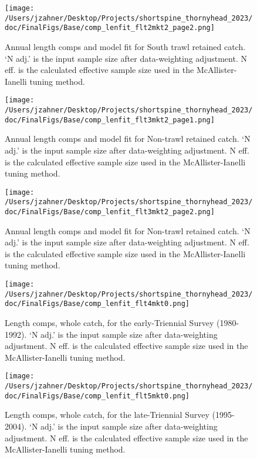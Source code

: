 \documentclass[11pt,
  english,
  letterpaper,
]{article}
\begin{document}
\begin{figure}
\centering
\texttt{[image: /Users/jzahner/Desktop/Projects/shortspine\_thornyhead\_2023/doc/FinalFigs/Base/comp\_lenfit\_flt2mkt2\_page2.png]}
\caption{Annual length comps and model fit for South trawl retained catch. `N adj.' is the input sample size after data-weighting adjustment. N eff. is the calculated effective sample size used in the McAllister-Ianelli tuning method.\label{fig:strawl_comps_2}}
\end{figure}

\begin{figure}
\centering
\texttt{[image: /Users/jzahner/Desktop/Projects/shortspine\_thornyhead\_2023/doc/FinalFigs/Base/comp\_lenfit\_flt3mkt2\_page1.png]}
\caption{Annual length comps and model fit for Non-trawl retained catch. `N adj.' is the input sample size after data-weighting adjustment. N eff. is the calculated effective sample size used in the McAllister-Ianelli tuning method.\label{fig:nontrawl_comps_1}}
\end{figure}

\begin{figure}
\centering
\texttt{[image: /Users/jzahner/Desktop/Projects/shortspine\_thornyhead\_2023/doc/FinalFigs/Base/comp\_lenfit\_flt3mkt2\_page2.png]}
\caption{Annual length comps and model fit for Non-trawl retained catch. `N adj.' is the input sample size after data-weighting adjustment. N eff. is the calculated effective sample size used in the McAllister-Ianelli tuning method.\label{fig:nontrawl_comps_2}}
\end{figure}

\begin{figure}
\centering
\texttt{[image: /Users/jzahner/Desktop/Projects/shortspine\_thornyhead\_2023/doc/FinalFigs/Base/comp\_lenfit\_flt4mkt0.png]}
\caption{Length comps, whole catch, for the early-Triennial Survey (1980-1992). `N adj.' is the input sample size after data-weighting adjustment. N eff. is the calculated effective sample size used in the McAllister-Ianelli tuning method.\label{fig:fits_etri}}
\end{figure}

\begin{figure}
\centering
\texttt{[image: /Users/jzahner/Desktop/Projects/shortspine\_thornyhead\_2023/doc/FinalFigs/Base/comp\_lenfit\_flt5mkt0.png]}
\caption{Length comps, whole catch, for the late-Triennial Survey (1995-2004). `N adj.' is the input sample size after data-weighting adjustment. N eff. is the calculated effective sample size used in the McAllister-Ianelli tuning method.\label{fig:fits_ltri}}
\end{figure}
\end{document}
